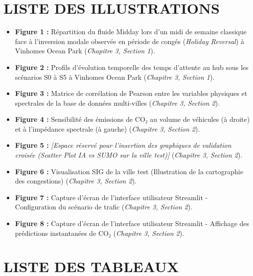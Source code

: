 \documentclass[10pt, a4paper]{article}
\providecommand{\tightlist}{}
\begin{document}
\newpage

\section{LISTE DES ILLUSTRATIONS}\label{liste-des-illustrations}

\begin{itemize}
\tightlist
\item
  \textbf{Figure 1 :} Répartition du fluide Midday lors d'un midi de
  semaine classique face à l'inversion modale observée en période de
  congés (\emph{Holiday Reversal}) à Vinhomes Ocean Park (\emph{Chapitre
  3, Section 1}).
\item
  \textbf{Figure 2 :} Profils d'évolution temporelle des temps d'attente
  au hub sous les scénarios S0 à S5 à Vinhomes Ocean Park
  (\emph{Chapitre 3, Section 1}).
\item
  \textbf{Figure 3 :} Matrice de corrélation de Pearson entre les
  variables physiques et spectrales de la base de données multi-villes
  (\emph{Chapitre 3, Section 2}).
\item
  \textbf{Figure 4 :} Sensibilité des émissions de CO₂ au volume de
  véhicules (à droite) et à l'impédance spectrale (à gauche)
  (\emph{Chapitre 3, Section 2}).
\item
  \textbf{Figure 5 :} \emph{{[}Espace réservé pour l'insertion des
  graphiques de validation croisée (Scatter Plot IA vs SUMO sur la ville
  test){]}} (\emph{Chapitre 3, Section 2}).
\item
  \textbf{Figure 6 :} Visualisation SIG de la ville test (Illustration
  de la cartographie des congestions) (\emph{Chapitre 3, Section 2}).
\item
  \textbf{Figure 7 :} Capture d'écran de l'interface utilisateur
  Streamlit - Configuration du scénario de trafic (\emph{Chapitre 3,
  Section 2}).
\item
  \textbf{Figure 8 :} Capture d'écran de l'interface utilisateur
  Streamlit - Affichage des prédictions instantanées de CO₂
  (\emph{Chapitre 3, Section 2}).
\end{itemize}

\newpage

\section{LISTE DES TABLEAUX}\label{liste-des-tableaux}
\end{document}
